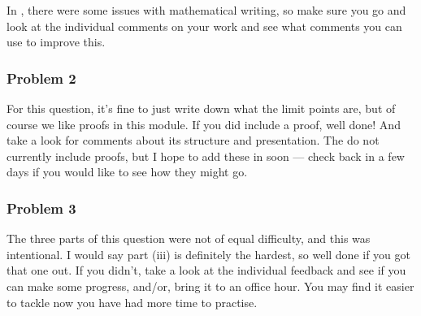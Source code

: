 \documentclass[letterpaper,10pt,english]{jupyterBook}
\begin{document}
\sphinxAtStartPar
In {\hyperref[\detokenize{Problems:p2}]{}}, there were some issues with mathematical writing, so make sure you go and look at the individual comments on your work and see what comments you can use to improve this.


\subsubsection{Problem 2}
\label{\detokenize{HW-feedback:problem-2}}
\sphinxAtStartPar
For this question, it’s fine to just write down what the limit points are, but of course we like proofs in this module. If you did include a proof, well done! And take a look for comments about its structure and presentation. The {\hyperref[\detokenize{Solutions-full:id1}]{}} do not currently include proofs, but I hope to add these in soon — check back in a few days if you would like to see how they might go.


\subsubsection{Problem 3}
\label{\detokenize{HW-feedback:problem-3}}
\sphinxAtStartPar
The three parts of this question were not of equal difficulty, and this was intentional. I would say part (iii) is definitely the hardest, so well done if you got that one out. If you didn’t, take a look at the individual feedback and see if you can make some progress, and/or, bring it to an office hour. You may find it easier to tackle now you have had more time to practise.
\end{document}
